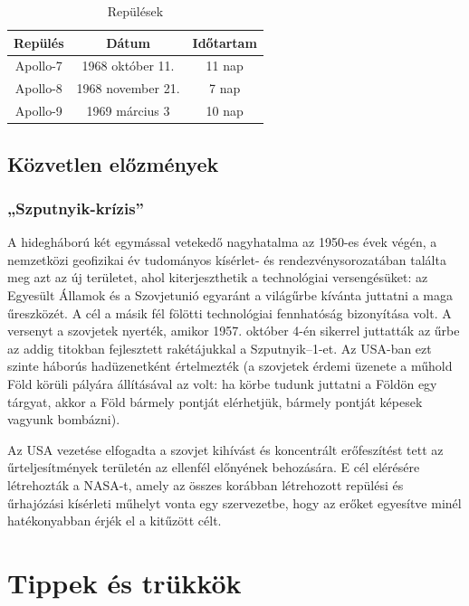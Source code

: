 \documentclass[12pt]{article}
\begin{document}
\begin{table}[htb]
  \caption{Repülések}
  \centering
  \begin{tabular}{ccc}
    \toprule
    Repülés & Dátum & Időtartam \\
    \midrule
    Apollo-7 & 1968 október 11. & 11 nap \\
    Apollo-8 & 1968 november 21. & 7 nap \\
    Apollo-9 & 1969 március 3 &  10 nap \\
    \bottomrule
  \end{tabular}
  \label{tab:repulesek}
\end{table}

\subsection{Közvetlen előzmények}

\subsubsection{„Szputnyik-krízis”}

A hidegháború két egymással vetekedő nagyhatalma az 1950-es évek végén, a nemzetközi geofizikai év tudományos kísérlet- és rendezvénysorozatában találta meg azt az új területet, ahol kiterjeszthetik a technológiai versengésüket: az Egyesült Államok és a Szovjetunió egyaránt a világűrbe kívánta juttatni a maga űreszközét. A cél a másik fél fölötti technológiai fennhatóság bizonyítása volt. A versenyt a szovjetek nyerték, amikor 1957. október 4-én sikerrel juttatták az űrbe az addig titokban fejlesztett rakétájukkal a Szputnyik–1-et. Az USA-ban ezt szinte háborús hadüzenetként értelmezték (a szovjetek érdemi üzenete a műhold Föld körüli pályára állításával az volt: ha körbe tudunk juttatni a Földön egy tárgyat, akkor a Föld bármely pontját elérhetjük, bármely pontját képesek vagyunk bombázni).

Az USA vezetése elfogadta a szovjet kihívást és koncentrált erőfeszítést tett az űrteljesítmények területén az ellenfél előnyének behozására. E cél elérésére létrehozták a NASA-t, amely az összes korábban létrehozott repülési és űrhajózási kísérleti műhelyt vonta egy szervezetbe, hogy az erőket egyesítve minél hatékonyabban érjék el a kitűzött célt. 


\section{Tippek és trükkök}
\end{document}
